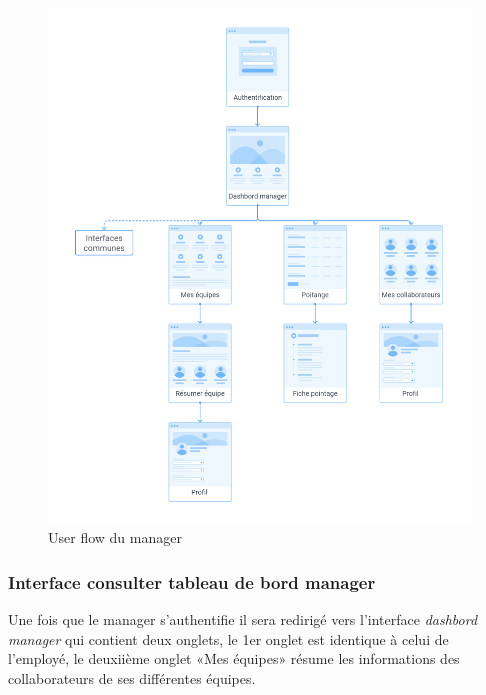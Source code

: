 \begin{figure}[h!]
    \vspace{-10pt}
    \centering
    \includegraphics[scale=0.38 ]{images/interface/Espace manager.png}
    \vspace{-30pt}
    \caption{User flow du manager}
    \label{fig95}
\end{figure}

\clearpage

\subsubsection*{Interface consulter tableau de bord manager}
Une fois que le manager s'authentifie il sera redirigé vers l’interface
\emph{dashbord manager} qui contient deux onglets, le 1er onglet est identique
à celui de l’employé, le deuxiième onglet «Mes équipes» résume les informations
des collaborateurs de ses différentes équipes. 

